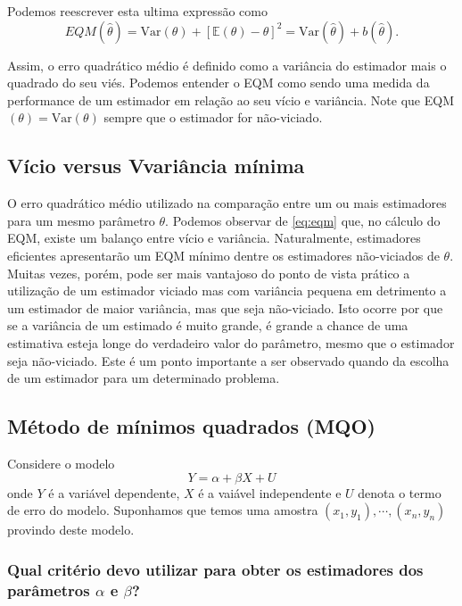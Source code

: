 \documentclass[
]{book}
\theoremstyle{definition}
\theoremstyle{definition}
\theoremstyle{definition}
\theoremstyle{remark}
\begin{document}
Podemos reescrever esta ultima expressão como
\[EQM (\hat\theta) = \mbox{Var}(\theta) + [\mathbb{E}(\theta) - \theta]^2 =\mbox{Var}(\hat{\theta})+b(\hat{\theta}).\]

Assim, o erro quadrático médio é definido como a variância do estimador mais o quadrado do seu viés. Podemos entender o EQM como sendo uma medida da performance de um estimador em relação ao seu vício e variância. Note que EQM\((\theta)=\mbox{Var}(\theta)\) sempre que o estimador for não-viciado.

\hypertarget{vuxedcio-versus-vvariuxe2ncia-muxednima}{%
\subsection{Vício versus Vvariância mínima}\label{vuxedcio-versus-vvariuxe2ncia-muxednima}}

O erro quadrático médio utilizado na comparação entre um ou mais estimadores para um
mesmo parâmetro \(\theta\). Podemos observar de \eqref{eq:eqm} que, no cálculo do EQM, existe um balanço entre vício e variância. Naturalmente, estimadores eficientes apresentarão um EQM mínimo dentre os estimadores não-viciados de \(\theta\). Muitas vezes, porém, pode ser mais vantajoso do ponto de vista prático a utilização de um estimador viciado mas com variância pequena em detrimento a um estimador de maior variância, mas que seja não-viciado. Isto ocorre por que se a variância de um estimado é muito grande, é grande a chance de uma estimativa esteja longe do verdadeiro valor do parâmetro, mesmo que o estimador seja não-viciado. Este é um ponto importante a ser observado quando da escolha de um estimador para um determinado
problema.

\hypertarget{muxe9todo-de-muxednimos-quadrados-mqo}{%
\subsection{Método de mínimos quadrados (MQO)}\label{muxe9todo-de-muxednimos-quadrados-mqo}}

Considere o modelo
\[Y={\alpha}+{\beta}X+U\]
onde \(Y\) é a variável dependente, \(X\) é a vaiável independente e \(U\) denota o termo de erro do modelo. Suponhamos que temos uma amostra \((x_1,y_1),\cdots,(x_n,y_n)\) provindo deste modelo.

\hypertarget{qual-crituxe9rio-devo-utilizar-para-obter-os-estimadores-dos-paruxe2metros-alpha-e-beta}{%
\subsubsection{\texorpdfstring{Qual critério devo utilizar para obter os estimadores dos parâmetros \(\alpha\) e \(\beta\)?}{Qual critério devo utilizar para obter os estimadores dos parâmetros \textbackslash alpha e \textbackslash beta?}}\label{qual-crituxe9rio-devo-utilizar-para-obter-os-estimadores-dos-paruxe2metros-alpha-e-beta}}
\end{document}
